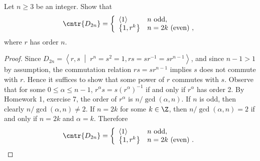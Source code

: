\documentclass[10pt]{amsart}
\begin{document}
\begin{thm}
  Let $n \geq 3$ be an integer.
  Show that 
  $$\cntr{D_{2n}} = \left\{\begin{array}{ll}
  \left<1\right> & n \text{ odd},\\
  \left\{1, r^k\right\} & n = 2k \text{ (even) },
  \end{array}\right.$$
  where $r$ has order $n$.
  \begin{proof}
    Since $D_{2n} = \left<r,s \;\middle\vert\; r^n = s^2 = 1, rs = sr^{-1} = sr^{n-1} \right>$, and since $n - 1 > 1$ by assumption, the commutation relation $rs = sr^{n-1}$ implies $s$ does not commute with $r$.
    Hence it suffices to show that some power of $r$ commutes with $s$.
    Observe that for some $0 \leq \alpha \leq n-1$, $r^\alpha s = s(r^\alpha)^{-1}$ if and only if $r^\alpha$ has order 2.
    By Homework 1, exercise 7, the order of $r^\alpha$ is $n/\gcd(\alpha,n)$.
    If $n$ is odd, then clearly $n/\gcd(\alpha,n) \not = 2$.
    If $n = 2k$ for some $k \in \Z$, then $n/\gcd(\alpha,n)= 2$ if and only if $n = 2k$ and $\alpha = k$.
    Therefore   
    $$\cntr{D_{2n}} = \left\{\begin{array}{ll}
    \left<1\right> & n \text{ odd},\\
    \left\{1, r^k\right\} & n = 2k \text{ (even) }.
    \end{array}\right.$$
  \end{proof}
\end{thm}
\end{document}
